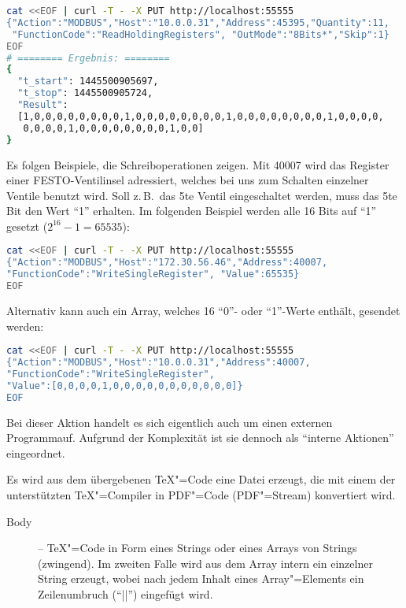 \documentclass[titlepage=false,toc=nobibliography]{vl-report}
\newcommand*\action[1]{\fbox{\nolinkurl{#1}}\medskip\par}
\begin{document}
\begin{description}
\begin{description}
\begin{lstlisting}[language=bash]
cat <<EOF | curl -T - -X PUT http://localhost:55555
{"Action":"MODBUS","Host":"10.0.0.31","Address":45395,"Quantity":11,
 "FunctionCode":"ReadHoldingRegisters", "OutMode":"8Bits*","Skip":1}
EOF
# ======== Ergebnis: ========
{
  "t_start": 1445500905697,
  "t_stop": 1445500905724,
  "Result":
  [1,0,0,0,0,0,0,0,0,1,0,0,0,0,0,0,0,0,1,0,0,0,0,0,0,0,0,1,0,0,0,0,
   0,0,0,0,1,0,0,0,0,0,0,0,0,1,0,0]
}
\end{lstlisting} 

\noindent Es folgen Beispiele, die Schreiboperationen zeigen. Mit 40007 wird 
das Register einer FESTO-Ventilinsel adressiert, welches bei uns zum Schalten 
einzelner Ventile benutzt wird. Soll z.\,B.\ das 5te Ventil eingeschaltet werden, 
muss das 5te Bit den Wert "`1"' erhalten. Im folgenden Beispiel werden alle 16 
Bits auf "`1"' gesetzt ($2^{16}-1 = 65535$):

\begin{lstlisting}[language=bash]
cat <<EOF | curl -T - -X PUT http://localhost:55555
{"Action":"MODBUS","Host":"172.30.56.46","Address":40007,
"FunctionCode":"WriteSingleRegister", "Value":65535}
EOF
\end{lstlisting}

\noindent Alternativ kann auch ein Array, welches 16 "`0"'- oder "`1"'-Werte 
enthält, gesendet werden:

\begin{lstlisting}[language=bash]
cat <<EOF | curl -T - -X PUT http://localhost:55555
{"Action":"MODBUS","Host":"10.0.0.31","Address":40007,
"FunctionCode":"WriteSingleRegister",
"Value":[0,0,0,0,1,0,0,0,0,0,0,0,0,0,0,0]}
EOF 
\end{lstlisting}


    \item \action{TEX}

      Bei dieser Aktion handelt es sich eigentlich auch um einen externen
      Programmauf. Aufgrund der Komplexität ist sie dennoch als "`interne
      Aktionen"' eingeordnet.

      Es wird aus dem übergebenen \TeX"=Code eine Datei erzeugt, die mit
      einem der unterstützten \TeX"=Compiler in PDF"=Code (PDF"=Stream)
      konvertiert wird.

      \begin{description}

        \item[Body] -- \TeX"=Code in Form eines Strings oder eines Arrays von
        Strings (zwingend). Im zweiten Falle wird aus dem Array intern ein
        einzelner String erzeugt, wobei nach jedem Inhalt eines
        Array"=Elements ein Zeilenumbruch ("`|\n|"') eingefügt wird.


\end{description}
\end{description}
\end{description}
\end{document}
